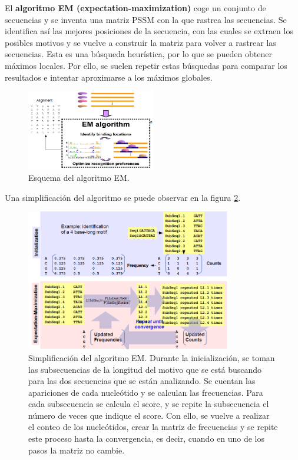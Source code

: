 El \textbf{algoritmo EM (expectation-maximization)} coge un conjunto de secuencias y se inventa una matriz PSSM con la que rastrea las secuencias. Se identifica así las mejores posiciones de la secuencia, con las cuales se extraen los posibles motivos y se vuelve a construir la matriz para volver a rastrear las secuencias. Esta es una búsqueda heurística, por lo que se pueden obtener máximos locales. Por ello, se suelen repetir estas búsquedas para comparar los resultados e intentar aproximarse a los máximos globales.
\begin{figure}[htbp]
\centering
\includegraphics[width = 0.5\textwidth]{figs/algoritmo-em.png}
\caption{Esquema del algoritmo EM.}
\label{fig:em}
\end{figure}

Una simplificación del algoritmo se puede observar en la figura \ref{fig:em-simp}.
\begin{figure}[htbp]
\centering
\includegraphics[width = 0.8\textwidth]{figs/em-pseudocode.png}
\caption{Simplificación del algoritmo EM. Durante la inicialización, se toman las subsecuencias de la longitud del motivo que se está buscando para las dos secuencias que se están analizando. Se cuentan las apariciones de cada nucleótido y se calculan las frecuencias. Para cada subsecuencia se calcula el score, y se repite la subsecuencia el número de veces que indique el score. Con ello, se vuelve a realizar el conteo de los nucleótidos, crear la matriz de frecuencias y se repite este proceso hasta la convergencia, es decir, cuando en uno de los pasos la matriz no cambie.}
\label{fig:em-simp}
\end{figure}

